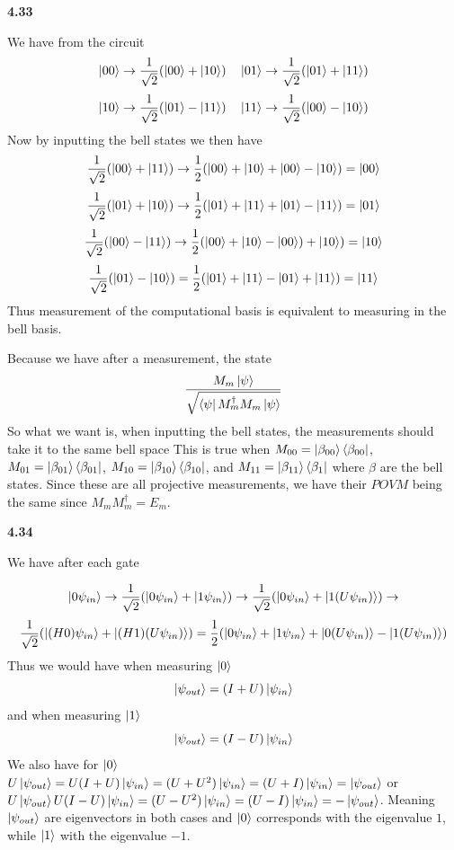 \textbf{4.33}

We have from the circuit \[\ket{00} \rightarrow \frac{1}{\sqrt{2}}(\ket{00} + \ket{10})\quad \ket{01} \rightarrow \frac{1}{\sqrt{2}}(\ket{01} + \ket{11})\]
\[\ket{10} \rightarrow \frac{1}{\sqrt{2}}(\ket{01} - \ket{11}) \quad \ket{11} \rightarrow \frac{1}{\sqrt{2}}(\ket{00} - \ket{10})\]
Now by inputting the bell states we then have 
\[\frac{1}{\sqrt{2}}(\ket{00}+\ket{11}) \rightarrow \frac{1}{2}(\ket{00} + \ket{10} + \ket{00} - \ket{10}) = \ket{00}\]
\[\frac{1}{\sqrt{2}}(\ket{01} + \ket{10}) \rightarrow \frac{1}{2}(\ket{01} + \ket{11} + \ket{01} - \ket{11}) = \ket{01}\]
\[\frac{1}{\sqrt{2}} (\ket{00} - \ket{11})\rightarrow \frac{1}{2}(\ket{00}+\ket{10} -\ket{00})+ \ket{10}) = \ket{10}\]
\[\frac{1}{\sqrt{2}}(\ket{01} - \ket{10}) = \frac{1}{2}(\ket{01} + \ket{11} - \ket{01} + \ket{11}) = \ket{11}\] Thus measurement of the computational basis is equivalent to measuring in the bell basis.

Because we have after a measurement, the state \[\frac{M_m\ket{\psi}}{\sqrt{\bra{\psi}M_m^\dag M_m \ket{\psi}}}\] So what we want is, when inputting the bell states, the measurements should take it to the same bell space This is true when $M_{00} = \ket{\beta_{00}}\bra{\beta_{00}}$, $M_{01} = \ket{\beta_{01}}\bra{\beta_{01}}$, $M_{10} = \ket{\beta_{10}}\bra{\beta_{10}}$, and $M_{11} = \ket{\beta_{11}}\bra{\beta_{1}}$ where $\beta$ are the bell states. Since these are all projective measurements, we have their $POVM$ being the same since $M_mM_m^\dag = E_m$.

\textbf{4.34}

We have after each gate

\[\ket{0\psi_{in}}\rightarrow \frac{1}{\sqrt{2}}(\ket{0\psi_{in}} + \ket{1\psi_{in}})\rightarrow \frac{1}{\sqrt{2}}(\ket{0\psi_{in}} + \ket{1(U\psi_{in})})\rightarrow \]
\[\frac{1}{\sqrt{2}}(\ket{(H0)\psi_{in}} + \ket{(H1)(U\psi_{in})}) =\frac{1}{2}(\ket{0\psi_{in}} +\ket{1\psi_{in}}  + \ket{0(U\psi_{in})}- \ket{1(U\psi_{in})})\] Thus we would have when measuring $\ket{0}$
\[\ket{\psi_{out}} = (I+U)\ket{\psi_{in}}\] and when measuring $\ket{1} $
\[\ket{\psi_{out}} = (I-U)\ket{\psi_{in}}\] We also have for $\ket{0}$ $U\ket{\psi_{out}} = U(I + U)\ket{\psi_{in}} = (U+ U^2)\ket{\psi_{in}} =(U+I)\ket{\psi_{in}} = \ket{\psi_{out}} $ or $ U\ket{\psi_{out}} U(I-U)\ket{\psi_{in}} =(U-U^2)\ket{\psi_{in}} =(U-I)\ket{\psi_{in}} = -\ket{\psi_{out}}$. Meaning $\ket{\psi_{out}}$ are eigenvectors in both cases and $\ket{0}$ corresponds with the eigenvalue $1$, while $\ket{1}$ with the eigenvalue $-1$.

